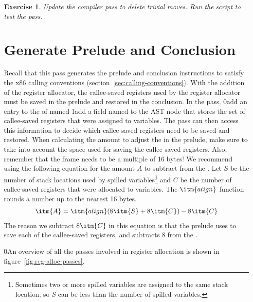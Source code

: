 \documentclass[7x10]{TimesAPriori_MIT}%
\def\racketEd{0}
\def\pythonEd{1}
\def\edition{1}
\newcommand{\racket}[1]{{\if\edition\racketEd{#1}\fi}}
\newcommand{\pythonColor}[0]{}
\newcommand{\python}[1]{{\if\edition\pythonEd\pythonColor #1\fi}}
\newtheorem{exercise}[theorem]{Exercise}
\numberwithin{theorem}{chapter}
\numberwithin{definition}{chapter}
\numberwithin{equation}{chapter}
\begin{document}
\begin{exercise}\normalfont\normalsize
%
Update the  compiler pass to delete trivial moves.
%
%
Run the script to test the  pass.
\end{exercise}


\section{Generate Prelude and Conclusion}
\label{sec:print-x86-reg-alloc}

Recall that this pass generates the prelude and conclusion
instructions to satisfy the x86 calling conventions
(section~\ref{sec:calling-conventions}). With the addition of the
register allocator, the callee-saved registers used by the register
allocator must be saved in the prelude and restored in the conclusion.
In the  pass,
%
\racket{add an entry to the 
  of  named }
%
\python{add a field named \code{used\_callee} to the \code{X86Program} AST node}
%
that stores the set of callee-saved registers that were assigned to
variables. The  pass can then access
this information to decide which callee-saved registers need to be
saved and restored.
%
When calculating the amount to adjust the  in the prelude,
make sure to take into account the space used for saving the
callee-saved registers. Also, remember that the frame needs to be a
multiple of 16 bytes! We recommend using the following equation for
the amount $A$ to subtract from the . Let $S$ be the number
of stack locations used by spilled variables\footnote{Sometimes two or
  more spilled variables are assigned to the same stack location, so
  $S$ can be less than the number of spilled variables.} and $C$ be
the number of callee-saved registers that were
allocated to
variables. The $\itm{align}$ function rounds a number up to the
nearest 16 bytes.
\[
   \itm{A} = \itm{align}(8\itm{S} + 8\itm{C}) - 8\itm{C}
\]
The reason we subtract $8\itm{C}$ in this equation is that the
prelude uses  to save each of the callee-saved registers,
and  subtracts $8$ from the .

\racket{An overview of all the passes involved in register
  allocation is shown in figure~\ref{fig:reg-alloc-passes}.}
\end{document}
